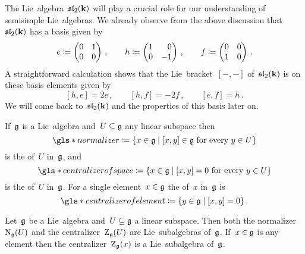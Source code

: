 \begin{remark}
  The Lie~algebra~$\mathfrak{sl}_2(\mathbf{k})$ will play a crucial role for our understanding of semisimple Lie~algebras.
  We already observe from the above discussion that~$\mathfrak{sl}_2(\mathbf{k})$ has a basis given by
  \[
    e
    \defined
    \begin{pmatrix}
      0 & 1 \\
      0 & 0
    \end{pmatrix} \,,
    \qquad
    h
    \defined
    \begin{pmatrix*}[r]
      1 &  0  \\
      0 & -1
    \end{pmatrix*}  \,,
    \qquad
    f
    \defined
    \begin{pmatrix}
      0 & 0 \\
      1 & 0
    \end{pmatrix} \,.
  \]
  A straightforward calculation shows that the Lie~bracket~$[-,-]$ of~$\mathfrak{sl}_2(\mathbf{k})$ is on these basis elements given by
  \[
    [h, e]
    =
    2e  \,,
    \qquad
    [h, f]
    =
    -2f \,,
    \qquad
    [e,f]
    =
    h \,.
  \]
  We will come back to~$\mathfrak{sl}_2(\mathbf{k})$ and the properties of this basis later on.
\end{remark}


\begin{definition}
  If~$\mathfrak{g}$ is a Lie~algebra and~$U \subseteq \mathfrak{g}$ any linear subspace then
  \[
    \gls*{normalizer}
    \defined
    \{
      x \in \glie
    \suchthat
      \text{$[x,y] \in \glie$ for every~$y \in U$}
    \}
  \]
  is the  of~$U$ in~$\mathfrak{g}$, and
  \[
    \gls*{centralizer of space}
    \defined
    \{
      x \in \glie
    \suchthat
      \text{$[x,y] = 0$ for every~$y \in U$}
    \}
  \]
  is the  of~$U$ in~$\mathfrak{g}$.
  For a single element~$x \in \mathfrak{g}$ the  of~$x$ in~$\mathfrak{g}$ is
  \[
    \gls*{centralizer of element}
    \defined
    \{
      y \in \glie
    \suchthat
      [x,y] = 0
    \} \,.
  \]
\end{definition}


\begin{lemma}
 Let~$\mathfrak{g}$ be a Lie~algebra and~$U \subseteq \mathfrak{g}$ a linear subspace.
 Then both the normalizer~$\operatorname{N}_{\mathfrak{g}}(U)$ and the centralizer~$\operatorname{Z}_{\mathfrak{g}}(U)$ are Lie~subalgebras of~$\mathfrak{g}$.
 If~$x \in \mathfrak{g}$ is any element then the centralizer~$\operatorname{Z}_{\mathfrak{g}}(x)$ is a Lie~subalgebra of~$\mathfrak{g}$.
\end{lemma}


